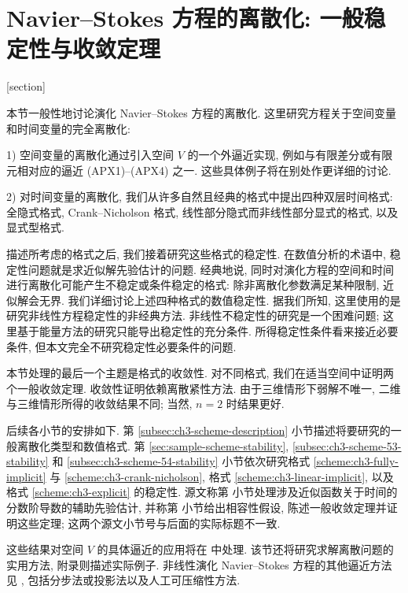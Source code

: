 \hypertarget{chapter-03-page-239-section-05}{}
\setcounter{section}{4}
\section{Navier--Stokes 方程的离散化: 一般稳定性与收敛定理}
\label{sec:ch3-general-stability-convergence}
[section]
\renewcommand{\thembscheme}{\thesection.\arabic{mbscheme}}

本节一般性地讨论演化 Navier--Stokes 方程的离散化. 这里研究方程关于空间变量和时间变量的完全离散化:

1) 空间变量的离散化通过引入空间 $V$ 的一个外逼近实现, 例如与有限差分或有限元相对应的逼近 (APX1)--(APX4) 之一. 这些具体例子将在别处作更详细的讨论.

2) 对时间变量的离散化, 我们从许多自然且经典的格式中提出四种双层时间格式: 全隐式格式, Crank--Nicholson 格式, 线性部分隐式而非线性部分显式的格式, 以及显式型格式.

描述所考虑的格式之后, 我们接着研究这些格式的稳定性. 在数值分析的术语中, 稳定性问题就是求近似解先验估计的问题. 经典地说, 同时对演化方程的空间和时间进行离散化可能产生不稳定或条件稳定的格式: 除非离散化参数满足某种限制, 近似解会无界. 我们详细讨论上述四种格式的数值稳定性. 据我们所知, 这里使用的是研究非线性方程稳定性的非经典方法. 非线性不稳定性的研究是一个困难问题; 这里基于能量方法的研究只能导出稳定性的充分条件. 所得稳定性条件看来接近必要条件, 但本文完全不研究稳定性必要条件的问题.

本节处理的最后一个主题是格式的收敛性. 对不同格式, 我们在适当空间中证明两个一般收敛定理. 收敛性证明依赖离散紧性方法. 由于三维情形下弱解不唯一, 二维与三维情形所得的收敛结果不同; 当然, $n=2$ 时结果更好.

后续各小节的安排如下. 第 \ref{subsec:ch3-scheme-description} 小节描述将要研究的一般离散化类型和数值格式. 第 \ref{sec:sample-scheme-stability}, \ref{subsec:ch3-scheme-53-stability} 和 \ref{subsec:ch3-scheme-54-stability} 小节依次研究格式 \ref{scheme:ch3-fully-implicit} 与 \ref{scheme:ch3-crank-nicholson}, 格式 \ref{scheme:ch3-linear-implicit}, 以及格式 \ref{scheme:ch3-explicit} 的稳定性. 源文称第  小节处理涉及近似函数关于时间的分数阶导数的辅助先验估计, 并称第  小节给出相容性假设, 陈述一般收敛定理并证明这些定理; 这两个源文小节号与后面的实际标题不一致.

这些结果对空间 $V$ 的具体逼近的应用将在  中处理. 该节还将研究求解离散问题的实用方法, 附录则描述实际例子. 非线性演化 Navier--Stokes 方程的其他逼近方法见 , 包括分步法或投影法以及人工可压缩性方法.

